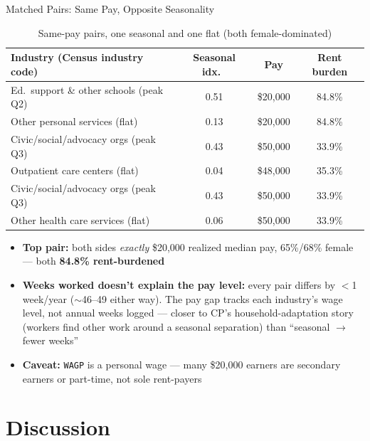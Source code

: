 \documentclass[aspectratio=169]{beamer}
\begin{document}
\begin{frame}{Matched Pairs: Same Pay, Opposite Seasonality}
  \begin{table}
    \centering
    \footnotesize
    \setlength{\tabcolsep}{5pt}
    \renewcommand{\arraystretch}{0.85}
    \caption{Same-pay pairs, one seasonal and one flat (both female-dominated)}
    \begin{tabular}{lccc}
      \toprule
      Industry (Census industry code) & Seasonal idx.\ & Pay & Rent burden \\
      \midrule
      Ed.\ support \& other schools (peak Q2) & 0.51 & \$20,000 & 84.8\% \\
      Other personal services (flat)          & 0.13 & \$20,000 & 84.8\% \\
      \addlinespace[2pt]
      Civic/social/advocacy orgs (peak Q3)    & 0.43 & \$50,000 & 33.9\% \\
      Outpatient care centers (flat)          & 0.04 & \$48,000 & 35.3\% \\
      \addlinespace[2pt]
      Civic/social/advocacy orgs (peak Q3)    & 0.43 & \$50,000 & 33.9\% \\
      Other health care services (flat)       & 0.06 & \$50,000 & 33.9\% \\
      \bottomrule
    \end{tabular}
  \end{table}
  \footnotesize
  \begin{itemize}
    \item \textbf{Top pair:} both sides \emph{exactly} \$20,000 realized
          median pay, 65\%/68\% female --- both \textbf{84.8\% rent-burdened}
    \item[$\to$] \textbf{Weeks worked doesn't explain the pay level:} every
          pair differs by $<$1 week/year ($\sim$46--49 either way). The pay
          gap tracks each industry's wage level, not annual weeks logged ---
          closer to CP's household-adaptation story (workers find other work
          around a seasonal separation) than ``seasonal $\to$ fewer weeks''
    \item \textbf{Caveat:} \texttt{WAGP} is a personal wage --- many \$20,000
          earners are secondary earners or part-time, not sole rent-payers
  \end{itemize}
\end{frame}

\section{Discussion}
\end{document}
